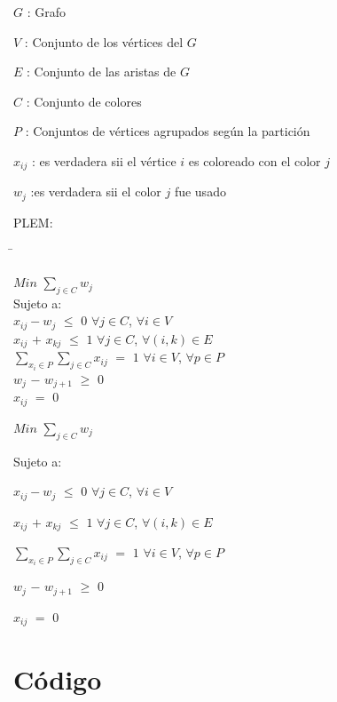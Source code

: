 \documentclass[a4paper]{article}
\begin{document}
$G$ : Grafo

$V$ : Conjunto de los vértices del $G$

$E$ : Conjunto de las aristas de $G$

$C$ : Conjunto de colores

$P$ : Conjuntos de vértices agrupados según la partición

$x_{ij}$ : es verdadera sii el vértice $i$ es coloreado con el color $j$

$w_j$ :es verdadera sii el color $j$ fue usado

PLEM:

\begin{tabbing}

\hspace*{4cm} \= \hspace*{4cm} \kill

$Min$ $ \sum_{j\in C} w_j$ \> \\

Sujeto a:\> \\

$x_{ij} - w_j$ $\leq$ $0$\>   $\forall j \in C$, $\forall i \in V$\\

$x_{ij}$ $+$ $x_{kj}$ $\leq$ $1$ \>  $\forall j \in C$, $\forall (i,k) \in E$\\

$\sum_{x_i \in P} \sum_{j \in C} x_{ij}$ $=$ $1$ \> $\forall i \in V$, $\forall p \in P$\\

$w_j$ $-$ $w_{j+1}$ $\geq$ $0$\> \\

$x_{ij}$ $=$ $0$ \> \\

\end{tabbing}

$Min$ $ \sum_{j\in C} w_j$

Sujeto a:

$x_{ij} - w_j$ $\leq$ $0$   $\forall j \in C$, $\forall i \in V$

$x_{ij}$ $+$ $x_{kj}$ $\leq$ $1$   $\forall j \in C$, $\forall (i,k) \in E$

$\sum_{x_i \in P} \sum_{j \in C} x_{ij}$ $=$ $1$  $\forall i \in V$, $\forall p \in P$

$w_j$ $-$ $w_{j+1}$ $\geq$ $0$

$x_{ij}$ $=$ $0$


\newpage

\section{Código}
\end{document}
